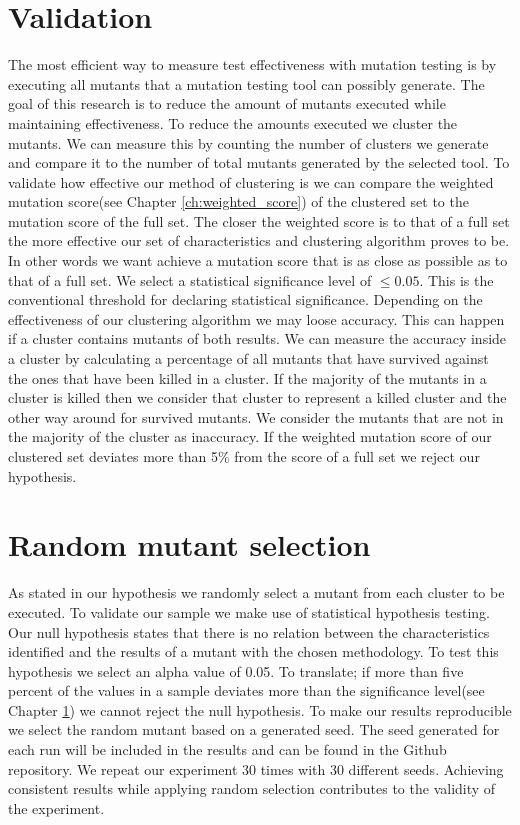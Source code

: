 \documentclass[../main]{subfiles}
\begin{document}
\section{Validation}
\label{ch:exp1_validation}
The most efficient way to measure test effectiveness with mutation testing is by executing all mutants that a mutation testing tool can possibly generate.
The goal of this research is to reduce the amount of mutants executed while maintaining effectiveness.
To reduce the amounts executed we cluster the mutants. 
We can measure this by counting the number of clusters we generate and compare it to the number of total mutants generated by the selected tool.
\newline
To validate how effective our method of clustering is we can compare the weighted mutation score(see Chapter \ref{ch:weighted_score}) of the clustered set to the mutation score of the full set.
The closer the weighted score is to that of a full set the more effective our set of characteristics and clustering algorithm proves to be.
In other words we want achieve a mutation score that is as close as possible as to that of a full set.
We select a statistical significance level of $\leq 0.05$.
This is the conventional threshold for declaring statistical significance\cite{Kirk1996PracticalCome}.
\newline
Depending on the effectiveness of our clustering algorithm we may loose accuracy.
This can happen if a cluster contains mutants of both results. 
We can measure the accuracy inside a cluster by calculating a percentage of all mutants that have survived against the ones that have been killed in a cluster.
If the majority of the mutants in a cluster is killed then we consider that cluster to represent a killed cluster and the other way around for survived mutants.
We consider the mutants that are not in the majority of the cluster as inaccuracy.
\newline
If the weighted mutation score of our clustered set deviates more than 5\% from the score of a full set we reject our hypothesis.

\section{Random mutant selection}
\label{ch:mutant_selection}
As stated in our hypothesis we randomly select a mutant from each cluster to be executed.
To validate our sample we make use of statistical hypothesis testing\cite{Emmert-Streib2019UnderstandingInference}. Our null hypothesis states that there is no relation between the characteristics identified and the results of a mutant with the chosen methodology.
To test this hypothesis we select an alpha value of 0.05.
To translate; if more than five percent of the values in a sample deviates more than the significance level(see Chapter \ref{ch:exp1_validation}) we cannot reject the null hypothesis.
To make our results reproducible we select the random mutant based on a generated seed.
The seed generated for each run will be included in the results and can be found in the Github repository\cite{rbasarat-repo}.
We repeat our experiment 30 times with 30 different seeds.
Achieving consistent results while applying random selection contributes to the validity of the experiment.
\end{document}
